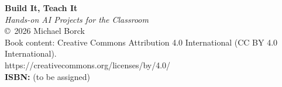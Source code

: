 \thispagestyle{empty}
\vspace*{2in}
\begin{center}
\textbf{\large Build It, Teach It}\\[0.3em]
\textit{Hands-on AI Projects for the Classroom}\\[1em]
\copyright\ 2026 Michael Borck\\[0.5em]
Book content: Creative Commons Attribution 4.0 International (CC BY 4.0 International).\\
https://creativecommons.org/licenses/by/4.0/\\[1em]
\textbf{ISBN:} (to be assigned)\\[1em]
\end{center}
\clearpage
